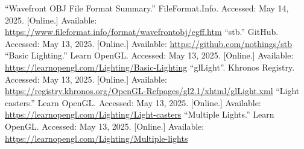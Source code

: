 \documentclass[12pt, a4paper]{article}
\begin{document}
\begin{thebibliography}{9}
        ``Wavefront OBJ File Format Summary.''{} FileFormat.Info. Accessed: May 14, 2025. [Online.]
        Available: \url{https://www.fileformat.info/format/wavefrontobj/egff.htm}
        ``stb.'' GitHub. Accessed: May 13, 2025. [Online.] Available:
        \url{https://github.com/nothings/stb}
        ``Basic Lighting.'' Learn OpenGL. Accessed: May 13, 2025. [Online.] Available:
        \url{https://learnopengl.com/Lighting/Basic-Lighting}
        ``glLight''. Khronos Registry. Accessed: May 13, 2025. [Online.] Available:
        \url{https://registry.khronos.org/OpenGL-Refpages/gl2.1/xhtml/glLight.xml}
        ``Light casters.'' Learn OpenGL. Accessed: May 13, 2025. [Online.] Available:
        \url{https://learnopengl.com/Lighting/Light-casters}
        ``Multiple Lights.'' Learn OpenGL. Accessed: May 13, 2025. [Online.] Available:
        \url{https://learnopengl.com/Lighting/Multiple-lights}
\end{thebibliography}
\endgroup
\end{document}
